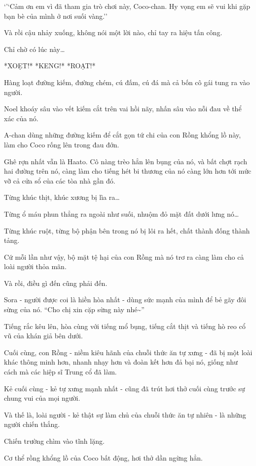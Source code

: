 \documentclass[../main.tex]{subfiles}
\begin{document}
`'`Cảm ơn em vì đã tham gia trò chơi này, Coco-chan. Hy vọng em sẽ vui khi gặp bạn bè của mình ở nơi suối vàng.''

Và rồi cậu nhảy xuống, không nói một lời nào, chỉ tay ra hiệu tấn công.

Chỉ chờ có lúc này\dots

*XOẸT!* *KENG!* *ROẠT!*

Hàng loạt đường kiếm, đường chém, cú đấm, cú đá mà cả bốn cô gái tung ra vào người.

Noel khoáy sâu vào vết kiếm cắt trên vai hồi nãy, nhấn sâu vào nỗi đau về thể xác của nó.

A-chan dùng những đường kiếm để cắt gọn tứ chi của con Rồng khổng lồ này, làm cho Coco rống lên trong đau đớn.

Ghê rợn nhất vẫn là Haato. Cô nàng trèo hẳn lên bụng của nó, và bất chợt rạch hai đường trên nó, càng làm cho tiếng hét bi thương của nó càng lớn hơn tới mức vỡ cả cửa sổ của các tòa nhà gần đó.

Từng khúc thịt, khúc xương bị lìa ra\dots

Từng ổ máu phun thẳng ra ngoài như suối, nhuộm đỏ mặt đất dưới lưng nó\dots

Từng khúc ruột, từng bộ phận bên trong nó bị lôi ra hết, chất thành đống thành tảng.

Cứ mỗi lần như vậy, bộ mặt tệ hại của con Rồng mà nó trơ ra càng làm cho cả loài người thỏa mãn.

Và rồi, điều gì đến cũng phải đến.

Sora - người được coi là hiền hòa nhất - dùng sức mạnh của mình để bẻ gãy đôi sừng của nó. ``Cho chị xin cặp sừng này nhé\~{}''

Tiếng rắc kêu lên, hòa cùng với tiếng mổ bụng, tiếng cắt thịt và tiếng hò reo cổ vũ của khán giả bên dưới.

Cuối cùng, con Rồng - niềm kiêu hãnh của chuỗi thức ăn tự xưng - đã bị một loài khác thông minh hơn, nhanh nhạy hơn và đoàn kết hơn đả bại nó, giống như cách mà các hiệp sĩ Trung cổ đã làm.

Kẻ cuối cùng - kẻ tự xưng mạnh nhất - cũng đã trút hơi thở cuối cùng trước sự chung vui của mọi người.

Và thế là, loài người - kẻ thật sự làm chủ của chuỗi thức ăn tự nhiên - là những người chiến thắng.

\ct

Chiến trường chìm vào tĩnh lặng.

Cơ thể rồng khổng lồ của Coco bất động, hơi thở dần ngừng hẳn.
\end{document}
